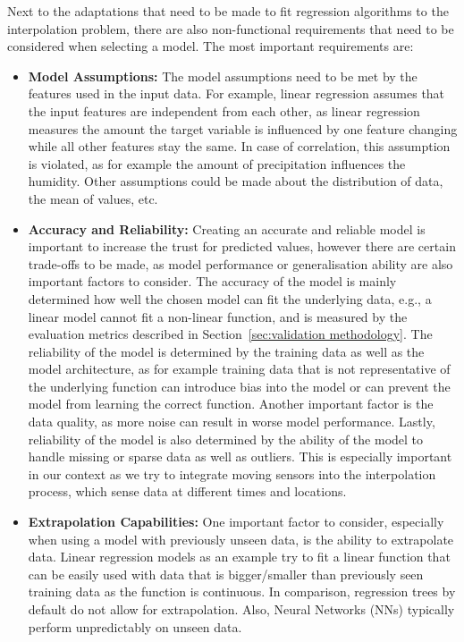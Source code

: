 Next to the adaptations that need to be made to fit regression algorithms to the interpolation problem, there are also non-functional requirements that need to be considered when selecting a model. The most important requirements are:

\begin{itemize}
    \item \textbf{Model Assumptions:} The model assumptions need to be met by the features used in the input data. For example, linear regression assumes that the input features are independent from each other, as linear regression measures the amount the target variable is influenced by one feature changing while all other features stay the same. In case of correlation, this assumption is violated, as for example the amount of precipitation influences the humidity. Other assumptions could be made about the distribution of data, the mean of values, etc.
    \item \textbf{Accuracy and Reliability:} Creating an accurate and reliable model is important to increase the trust for predicted values, however there are certain trade-offs to be made, as model performance or generalisation ability are also important factors to consider.
    The accuracy of the model is mainly determined how well the chosen model can fit the underlying data, e.g., a linear model cannot fit a non-linear function, and is measured by the evaluation metrics described in Section~\ref{sec:validation methodology}.
    The reliability of the model is determined by the training data as well as the model architecture, as for example training data that is not representative of the underlying function can introduce bias into the model or can prevent the model from learning the correct function. Another important factor is the data quality, as more noise can result in worse model performance. Lastly, reliability of the model is also determined by the ability of the model to handle missing or sparse data as well as outliers. This is especially important in our context as we try to integrate moving sensors into the interpolation process, which sense data at different times and locations.
    \item \textbf{Extrapolation Capabilities:} One important factor to consider, especially when using a model with previously unseen data, is the ability to extrapolate data. Linear regression models as an example try to fit a linear function that can be easily used with data that is bigger/smaller than previously seen training data as the function is continuous. In comparison, regression trees by default do not allow for extrapolation. Also, Neural Networks (NNs) typically perform unpredictably on unseen data.

\end{itemize}
